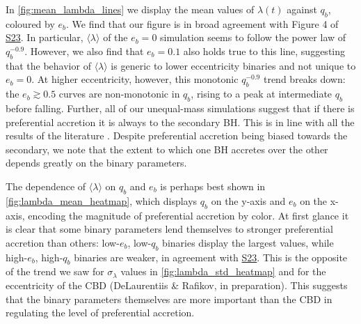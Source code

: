 \documentclass[fleqn,usenatbib]{mnras}
\newcommand{\Stwentythree}{\href{https://doi.org/10.1093/mnras/stac3263}{S23}\xspace}
\begin{document}
In \autoref{fig:mean_lambda_lines} we display the mean values of $\lambda(t)$ against $q_b$, coloured by $e_b$. We find that our figure is in broad agreement with Figure 4 of \Stwentythree. In particular, $\langle \lambda \rangle$ of the $e_b=0$ simulation seems to follow the power law of $q_b^{-0.9}$. However, we also find that $e_b=0.1$ also holds true to this line, suggesting that the behavior of $\langle \lambda \rangle $ is generic to lower eccentricity binaries and not unique to $e_b=0$. At higher eccentricity, however, this monotonic $q_b^{-0.9}$ trend breaks down: the $e_b \gtrsim 0.5$ curves are non-monotonic in $q_b$, rising to a peak at intermediate $q_b$ before falling. Further, all of our unequal-mass simulations suggest that if there is preferential accretion it is always to the secondary BH. This is in line with all the results of the literature \citep{munoz_miranda_lai_19, duffell_dorazio_2020, farris_2014, Dittmann_Ryan_21, siwek_prefacc}. Despite preferential accretion being biased towards the secondary, we note that the extent to which one BH accretes over the other depends greatly on the binary parameters.

The dependence of $\langle \lambda \rangle$ on $q_b$ and $e_b$ is perhaps best shown in \autoref{fig:lambda_mean_heatmap}, which displays $q_b$ on the y-axis and $e_b$ on the x-axis, encoding the magnitude of preferential accretion by color. At first glance it is clear that some binary parameters lend themselves to stronger preferential accretion than others: low-$e_b$, low-$q_b$ binaries display the largest values, while high-$e_b$, high-$q_b$ binaries are weaker, in agreement with \Stwentythree. This is the opposite of the trend we saw for $\sigma_{\lambda}$ values in \autoref{fig:lambda_std_heatmap} and for the eccentricity of the CBD (DeLaurentiis \& Rafikov, in preparation). This suggests that the binary parameters themselves are more important than the CBD in regulating the level of preferential accretion.
\end{document}
